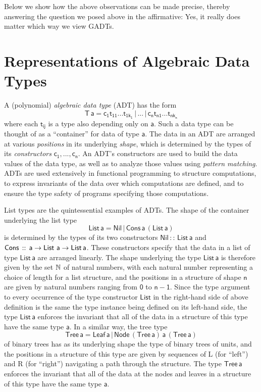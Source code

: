 \documentclass[acmsmall,screen,review,anonymous]{acmart}
\theoremstyle{definition}
\begin{document}
Below we show how the above observations can be made precise, thereby
answering the question we posed above in the affirmative: Yes, it
really does matter which way we view GADTs.

\section{Representations of Algebraic Data Types}\label{sec:adts}

A (polynomial) {\em algebraic data type} (ADT) has the form
\[\mathsf{T\,a} = \mathsf{c_1 t_{11}}...\mathsf{t_{1k_1}}\, |\, ...\, |\,
\mathsf{c_n t_{n1}}...\mathsf{t_{nk_n}}\] where each $\mathsf{t_{ij}}$
is a type also depending only on $\mathsf{a}$. Such a data type can be
thought of as a ``container'' for data of type $\mathsf{a}$. The data
in an ADT are arranged at various {\em positions} in its underlying
{\em shape}, which is determined by the types of its {\em
  constructors} $\mathsf{c_1},...,\mathsf{c_n}$. An ADT's constructors
are used to build the data values of the data type, as well as to
analyze those values using {\em pattern matching}. ADTs are used
extensively in functional programming to structure computations, to
express invariants of the data over which computations are defined,
and to ensure the type safety of programs specifying those
computations.

List types are the quintessential examples of ADTs. The shape of the
container underlying the list type
\[\mathsf{List\,a} = \mathsf{Nil} \,|\, \mathsf{Cons\,a\,(List\,a)}\]
is determined by the types of its two constructors $\mathsf{Nil\, ::\,
  List\, a}$ and $\mathsf{Cons \,::\,a \to \mathsf{List}\,\,a\to
  List\,a}$. These constructors specify that the data in a list of
type $\mathsf{List\,a}$ are arranged linearly. The shape underlying
the type $\mathsf{List\,a}$ is therefore given by the set $\mathbb{N}$ of
natural numbers, with each natural number representing a choice of
length for a list structure, and the positions in a structure of shape
$\mathsf{n}$ are given by natural numbers ranging from $\mathsf{0}$ to
$\mathsf{n-1}$. Since the type argument to every occurrence of the
type constructor $\mathsf{List}$ in the right-hand side of above
definition is the same the type instance being defined on its
left-hand side, the type $\mathsf{List\,a}$ enforces the invariant
that all of the data in a structure of this type have the same type
$\mathsf{a}$. In a similar way, the tree type
\[\mathsf{Tree\, a} = \mathsf{Leaf\,a}
\,|\,\mathsf{Node\,(Tree\,a)\,a\,(Tree\,a)}\] of binary trees has as
its underlying shape the type of binary trees of units, and the
positions in a structure of this type are given by sequences of L (for
``left'') and R (for ``right'') navigating a path through the
structure. The type $\mathsf{Tree\, a}$ enforces the invariant that
all of the data at the nodes and leaves in a structure of this type
have the same type $\mathsf{a}$.
\end{document}
